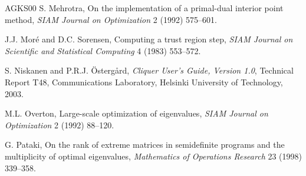 \documentclass[11pt]{article}
\theoremstyle{definition}
\theoremstyle{remark}
\begin{document}
\begin{thebibliography}{AGKS00}
  S. Mehrotra,
  On the implementation of a primal-dual interior point method,
  {\em SIAM Journal on Optimization\/} 2 (1992) 575--601.

  J.J. Mor\'e and D.C. Sorensen,
  Computing a trust region step,
  {\em SIAM Journal on Scientific and Statistical Computing\/} 4 (1983)
  553--572.

  S. Niskanen and P.R.J. \"Osterg\aa rd,
  {\em Cliquer User's Guide, Version 1.0\/},
  Technical Report T48, Communications Laboratory,
  Helsinki University of Technology, 2003.

  M.L. Overton,
  Large-scale optimization of eigenvalues,
  {\em SIAM Journal on Optimization\/} 2 (1992) 88--120.

  G. Pataki,
  On the rank of extreme matrices in semidefinite programs and the
  multiplicity of optimal eigenvalues,
  {\em Mathematics of Operations Research\/} 23 (1998) 339--358.

\end{thebibliography}
\end{document}
